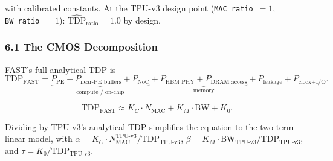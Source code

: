 \documentclass[11pt,a4paper]{article}
\newcommand{\ic}[1]{\texttt{#1}}
\begin{document}
with calibrated constants. At the TPU-v3 design point (\ic{MAC\_ratio}~$=1$, \ic{BW\_ratio}~$=1$):
$\widehat{\text{TDP}}_{\text{ratio}} = 1.0$ by design.


\subsubsection*{6.1 The CMOS Decomposition}

FAST's full analytical TDP is
\begin{equation}
\text{TDP}_{\text{FAST}}
= \underbrace{P_{\text{PE}} + P_{\text{near-PE buffers}} + P_{\text{NoC}}}_{\text{compute / on-chip}}
+ \underbrace{P_{\text{HBM PHY}} + P_{\text{DRAM access}}}_{\text{memory}}
+ P_{\text{leakage}} + P_{\text{clock+I/O}}.
\end{equation}



\begin{equation}
\text{TDP}_{\text{FAST}} \approx
K_C \cdot N_{\text{MAC}} +
K_M \cdot \text{BW} +
K_0.
\end{equation}

Dividing by TPU-v3's analytical TDP simplifies the equation to the two-term linear model, with
$\alpha = K_C \cdot N_{\text{MAC}}^{\text{TPU-v3}} / \text{TDP}_{\text{TPU-v3}}$,
$\beta  = K_M \cdot \text{BW}_{\text{TPU-v3}} / \text{TDP}_{\text{TPU-v3}}$,
and $\tau = K_0 / \text{TDP}_{\text{TPU-v3}}$.
\end{document}
